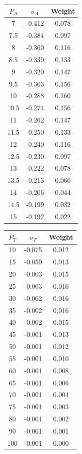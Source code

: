 \documentclass[a4paper,12pt]{article}
\numberwithin{equation}{section}
\begin{document}
\pagebreak

\begin{multicols}{2}
\begin{tabular}[h]{|c|c|c|}
\hline
$P_A$  & $\sigma_A$ & Weight \\ \hline
7 & -0.412 & 0.078 \\ \hline
7.5 & -0.384 & 0.097 \\ \hline
8 & -0.360 & 0.116 \\ \hline
8.5 & -0.339 & 0.133 \\ \hline
9 & -0.320 & 0.147 \\ \hline
9.5 & -0.303 & 0.156 \\ \hline
10 & -0.288 & 0.160 \\ \hline
10.5 & -0.274 & 0.156 \\ \hline
11 & -0.262 & 0.147 \\ \hline
11.5 & -0.250 & 0.133 \\ \hline
12 & -0.240 & 0.116 \\ \hline
12.5 & -0.230 & 0.097 \\ \hline
13 & -0.222 & 0.078 \\ \hline
13.5 & -0.213 & 0.060 \\ \hline
14 & -0.206 & 0.044 \\ \hline
14.5 & -0.199 & 0.032 \\ \hline
15 & -0.192 & 0.022 \\ \hline
\end{tabular}
\label{Table:SigmaA}

\columnbreak

\begin{tabular}[h]{|c|c|c|}
\hline

$P_T$ & $\sigma_T$ & Weight \\ \hline
10 & -0.075 & 0.012 \\ \hline
15 & -0.050 & 0.013 \\ \hline
20 & -0.003 & 0.015 \\ \hline
25 & -0.003 & 0.016 \\ \hline
30 & -0.002 & 0.016 \\ \hline
35 & -0.002 & 0.016 \\ \hline
40 & -0.002 & 0.015 \\ \hline
45 & -0.001 & 0.013 \\ \hline
50 & -0.001 & 0.012 \\ \hline
55 & -0.001 & 0.010 \\ \hline
60 & -0.001 & 0.008 \\ \hline
65 & -0.001 & 0.006 \\ \hline
70 & -0.001 & 0.004 \\ \hline
75 & -0.001 & 0.003 \\ \hline
80 & -0.001 & 0.002 \\ \hline
90 & -0.001 & 0.001 \\ \hline
100 & -0.001 & 0.000 \\ \hline
\end{tabular}
\label{Table:SigmaT}
\end{multicols}
\end{document}
